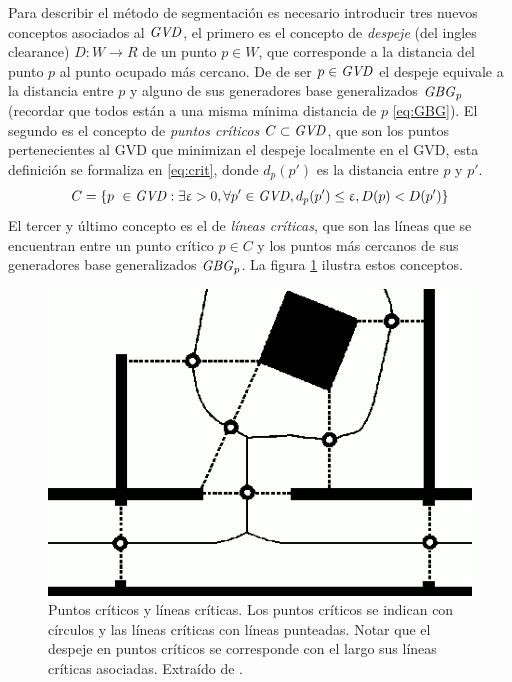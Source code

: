 Para describir el método de segmentación es necesario introducir tres nuevos conceptos asociados al $\mathit{GVD}$, el primero es el concepto de \emph{despeje} (del ingles clearance) $D : W \rightarrow R$ de un punto $p \in W$, que corresponde a la distancia del punto $p$ al punto ocupado más cercano. De de ser $p \in \mathit{GVD}$ el despeje equivale a la distancia entre $p$ y alguno de sus generadores base generalizados $\mathit{GBG}_p$ (recordar que todos están a una misma mínima distancia de $p$ \eqref{eq:GBG}). El segundo es el concepto de \emph{puntos críticos} $C \subset \mathit{GVD}$, que son los puntos pertenecientes al GVD que minimizan el despeje localmente en el GVD, esta definición se formaliza en \eqref{eq:crit}, donde $d_p(p')$ es la distancia entre $p$ y $p'$. 
\begin{equation}
  C = \{p\ \in \mathit{GVD} : \exists \upvarepsilon > 0, \forall p' \in \mathit{GVD}, d_p(p') \leq \upvarepsilon, D(p) < D(p') \} \label{eq:crit}
\end{equation}
El tercer y último concepto es el de \emph{líneas críticas}, que son las líneas
que se encuentran entre un punto crítico $p \in C$ y los puntos más cercanos de
sus generadores base generalizados $\mathit{GBG}_p$. La figura \ref{fig:crits}
ilustra estos conceptos.

\begin{figure}[H]
  \center
  \includegraphics[width=0.75\linewidth]{imagenes/CritsSharpMono.png}
  \caption[Puntos críticos y lineas críticas.]{Puntos críticos y líneas críticas. Los puntos críticos se indican con círculos y las líneas críticas con líneas punteadas. Notar que el despeje en puntos críticos se corresponde con el largo sus líneas críticas asociadas. Extraído de \cite{Thrun1998}.}\label{fig:crits}
\end{figure} 



